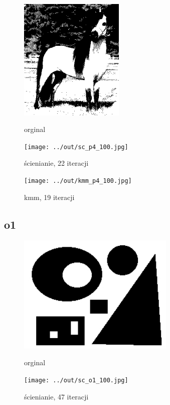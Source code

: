 \documentclass[a4paper,12pt]{article}
\begin{document}
\begin{figure}[h!]
\begin{minipage}[t]{5cm}
\begin{center}
\includegraphics[width=5cm]{../in/p4.jpg}
\caption{orginal}
\end{center}
\end{minipage}
\hfill
\begin{minipage}[t]{5cm}
\begin{center}
\texttt{[image: ../out/sc\_p4\_100.jpg]}
\caption{ścienianie, 22 iteracji}
\end{center}
\end{minipage}
\hfill
\begin{minipage}[t]{5cm}
\begin{center}
\texttt{[image: ../out/kmm\_p4\_100.jpg]}
\caption{kmm, 19 iteracji}
\end{center}
\end{minipage}
\end{figure}



\newpage
\subsection{o1}

\begin{figure}[h!]
\begin{minipage}[t]{7.5cm}
\begin{center}
\includegraphics[width=7.5cm]{../in/o1.jpg}
\caption{orginal}
\end{center}
\end{minipage}
\hfill
\begin{minipage}[t]{7.5cm}
\begin{center}
\texttt{[image: ../out/sc\_o1\_100.jpg]}
\caption{ścienianie, 47 iteracji}
\end{center}
\end{minipage}
\end{figure}
\end{document}
